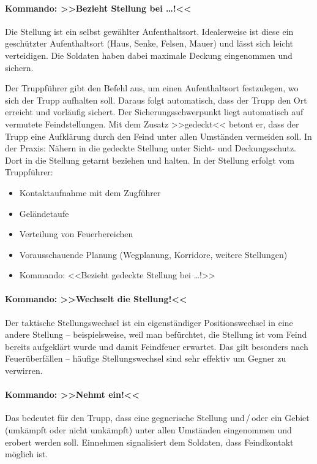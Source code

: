 \paragraph*{Kommando: >>Bezieht Stellung bei \dots!<<}
	Die Stellung ist ein selbst gewählter Aufenthaltsort. Idealerweise ist diese ein geschützter Aufenthaltsort (Haus, Senke, Felsen, Mauer) und lässt sich leicht verteidigen. Die Soldaten haben dabei maximale Deckung eingenommen und sichern.\par
	Der Truppführer gibt den Befehl aus, um einen Aufenthaltsort festzulegen, wo sich der Trupp aufhalten soll. Daraus folgt automatisch, dass der Trupp den Ort erreicht und vorläufig sichert. Der Sicherungsschwerpunkt liegt automatisch auf vermutete Feindstellungen. Mit dem Zusatz >>gedeckt<< betont er, dass der Trupp eine Aufklärung durch den Feind unter allen Umständen vermeiden soll. In der Praxis: Nähern in die gedeckte Stellung unter Sicht- und Deckungsschutz. Dort in die Stellung getarnt beziehen und halten. In der Stellung erfolgt vom Truppführer:
		\begin{itemize}
			\item Kontaktaufnahme mit dem Zugführer 
			\item Geländetaufe 
			\item Verteilung von Feuerbereichen 
			\item Vorausschauende Planung (Wegplanung, Korridore, weitere Stellungen) 
			\item Kommando: <<Bezieht gedeckte Stellung bei \dots!>> 
		\end{itemize}

\paragraph*{Kommando: >>Wechselt die Stellung!<<}
	Der taktische Stellungswechsel ist ein eigenständiger Positionswechsel in eine andere Stellung -- beispielsweise, weil man befürchtet, die Stellung ist vom Feind bereits aufgeklärt wurde und damit Feindfeuer erwartet. Das gilt besonders nach Feuerüberfällen -- häufige Stellungswechsel sind sehr effektiv um Gegner zu verwirren.

\paragraph*{Kommando: >>Nehmt ein!<<}
	Das bedeutet für den Trupp, dass eine gegnerische Stellung und\,/\,oder ein Gebiet (umkämpft oder nicht umkämpft) unter allen Umständen eingenommen und erobert werden soll. Einnehmen signalisiert dem Soldaten, dass Feindkontakt möglich ist.

